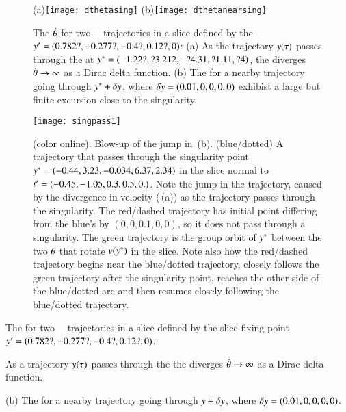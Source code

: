  \begin{figure}
 \begin{center}
(a)\texttt{[image: dthetasing]}%
(b)\texttt{[image: dthetanearsing]}%
 \end{center}
 \caption{\label{fig:dthetasing}
The {\groupVel} $\dot{{\bf \theta}}$ for two \cLf\
\reducedsp\ trajectories in a slice defined by the {\template} ${y'}=(0.782?,-0.277?,-0.4?,0.12?,0)$:
 (a) As the trajectory $y(\tau)$ passes through the
{\sset} 
 at $y^*=(-1.22?, ?3.212, -?4.31, ?1.11, ?4)$,
the {\groupVel} diverges
$\dot{{\bf \theta}} \to \infty$ as a Dirac delta function.
(b) The {\groupVel} for a nearby trajectory going
through $y^*+\delta y$,
where $\delta y=(0.01,0,0,0,0)$ exhibist a large
but finite excursion close to the singularity.
 }%
 \end{figure}

 \begin{figure}
 \begin{center}
\texttt{[image: singpass1]}
 \end{center}
 \caption{\label{fig:singpass}
(color online).
Blow-up of the jump in \,(b).
(blue/dotted) A trajectory that passes through the singularity point
$y^*=(-0.44, 3.23, -0.034, 6.37, 2.34)$ in the slice normal to
$t'_{}=(-0.45, -1.05, 0.3, 0.5, 0.)$.
Note the jump in the trajectory,  caused by the divergence in
velocity (\,(a)) as the trajectory
passes through the singularity. The red/dashed trajectory has initial
point differing from the blue's by $(0,0,0.1,0,0)$, so it does not pass
through a singularity. The green trajectory is the group orbit of
$y^*$ between the two ${\bf \theta}$ that rotate $v(y^*)$ in the
slice. Note also how the red/dashed trajectory begins near the
blue/dotted trajectory, closely follows the green trajectory after the
singularity point, reaches the other side of the blue/dotted arc and then
resumes closely following the blue/dotted trajectory.
 }%
 \end{figure}



The {\groupVel} for two \cLf\
\reducedsp\ trajectories in a slice defined by the slice-fixing
point ${y'}=(0.782?,-0.277?,-0.4?,0.12?,0)$.

As a trajectory $y(\tau)$ passes through the
{\sset} 
the {\groupVel} diverges
$\dot{{\bf \theta}} \to \infty$ as a Dirac delta function.

(b) The {\groupVel} for a nearby trajectory going
through $y+\delta y$,
where $\delta y=(0.01,0,0,0,0)$.




%

